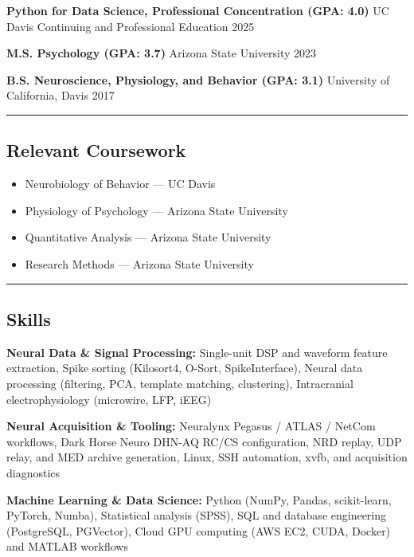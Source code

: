\documentclass[11pt]{article}
\begin{document}
\textbf{Python for Data Science, Professional Concentration (GPA: 4.0)}
\textbar{} UC Davis Continuing and Professional Education \textbar{}
2025

\textbf{M.S. Psychology (GPA: 3.7)} \textbar{} Arizona State University
\textbar{} 2023

\textbf{B.S. Neuroscience, Physiology, and Behavior (GPA: 3.1)}
\textbar{} University of California, Davis \textbar{} 2017

\begin{center}\rule{0.5\linewidth}{0.5pt}\end{center}

\subsection{Relevant Coursework}\label{relevant-coursework}

\begin{itemize}
\tightlist
\item
  Neurobiology of Behavior --- UC Davis
\item
  Physiology of Psychology --- Arizona State University
\item
  Quantitative Analysis --- Arizona State University
\item
  Research Methods --- Arizona State University
\end{itemize}

\begin{center}\rule{0.5\linewidth}{0.5pt}\end{center}

\subsection{Skills}\label{skills}

\textbf{Neural Data \& Signal Processing:} Single-unit DSP and waveform
feature extraction, Spike sorting (Kilosort4, O-Sort, SpikeInterface),
Neural data processing (filtering, PCA, template matching, clustering),
Intracranial electrophysiology (microwire, LFP, iEEG)

\textbf{Neural Acquisition \& Tooling:} Neuralynx Pegasus / ATLAS /
NetCom workflows, Dark Horse Neuro DHN-AQ RC/CS configuration, NRD
replay, UDP relay, and MED archive generation, Linux, SSH automation,
xvfb, and acquisition diagnostics

\textbf{Machine Learning \& Data Science:} Python (NumPy, Pandas,
scikit-learn, PyTorch, Numba), Statistical analysis (SPSS), SQL and
database engineering (PostgreSQL, PGVector), Cloud GPU computing (AWS
EC2, CUDA, Docker) and MATLAB workflows
\end{document}
